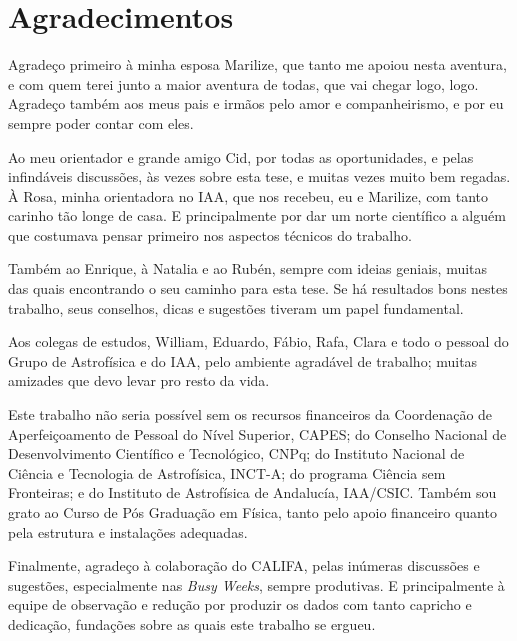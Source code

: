 


\chapter*{Agradecimentos}

Agradeço primeiro à minha esposa Marilize, que tanto me apoiou nesta aventura, e
com quem terei junto a maior aventura de todas, que vai chegar logo, logo. 
Agradeço também aos meus pais e irmãos pelo amor e companheirismo, e por eu
sempre poder contar com eles.

Ao meu orientador e grande amigo Cid, por todas as oportunidades, e pelas
infindáveis discussões, às vezes sobre esta tese, e muitas vezes muito bem
regadas. À Rosa, minha orientadora no IAA, que nos recebeu, eu e Marilize, com
tanto carinho tão longe de casa. E principalmente por dar um norte científico a
alguém que costumava pensar primeiro nos aspectos técnicos do trabalho.

Também ao Enrique, à Natalia e ao Rubén, sempre com ideias geniais, muitas das
quais encontrando o seu caminho para esta tese. Se há resultados bons nestes
trabalho, seus conselhos, dicas e sugestões tiveram um papel fundamental.

Aos colegas de estudos, William, Eduardo, Fábio, Rafa, Clara e todo o pessoal
do Grupo de Astrofísica e do IAA, pelo ambiente agradável de trabalho; muitas
amizades que devo levar pro resto da vida.

Este trabalho não seria possível sem os recursos financeiros da Coordenação de
Aperfeiçoamento de Pessoal do Nível Superior, CAPES; do Conselho Nacional de
Desenvolvimento Científico e Tecnológico, CNPq; do Instituto Nacional de Ciência
e Tecnologia de Astrofísica, INCT-A; do programa Ciência sem Fronteiras; e do
Instituto de Astrofísica de Andalucía, IAA/CSIC. Também sou grato ao Curso de
Pós Graduação em Física, tanto pelo apoio financeiro quanto pela estrutura e
instalações adequadas.

Finalmente, agradeço à colaboração do CALIFA, pelas inúmeras discussões e
sugestões, especialmente nas {\em Busy Weeks}, sempre produtivas. E
principalmente à equipe de observação e redução por produzir os dados com tanto
capricho e dedicação, fundações sobre as quais este trabalho se ergueu.

\clearpage

